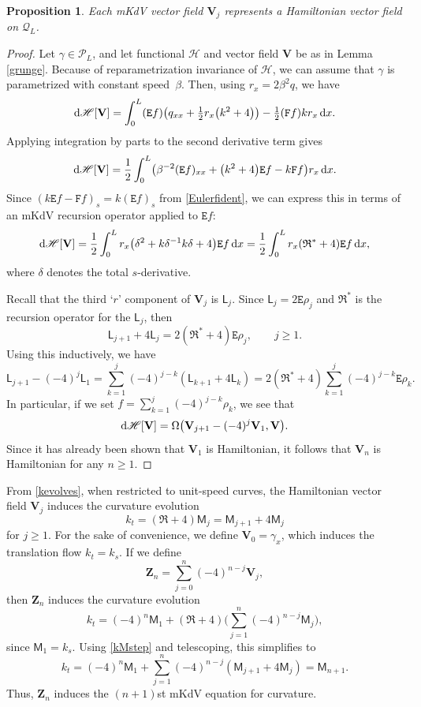 \documentclass[10pt,a4paper]{amsart}
\def\opR{\mathfrak R}
\newcommand\Leg{ {\mathcal P}} %
\newcommand\Legq{\mathcal Q}
\def\Fop{\mathtt F} %
\def\Euler{\mathtt E}
\newcommand\uM{\mathsf M} %
\newcommand\uL{\mathsf L} %
\newcommand\kk{k} %
\newcommand\speed{\beta} %
\def\vecV{\mathbf V}
\newcommand\VV{\mathbf V}
\newcommand\VZ{\mathbf Z}
\newcommand\funH{{\mathscr H}} %
\newcommand{\dx}{\,{\rm d}x}
\def\gam{\gamma} %
\numberwithin{equation}{section}
\newtheorem{Proposition}[Theorem]{Proposition}
 { \theoremstyle{definition}
\newtheorem{Definition}[Theorem]{Definition}
\newtheorem{Note}[Theorem]{Note}
\newtheorem{Example}[Theorem]{Example}
\newtheorem{Remark}[Theorem]{Remark} }
\begin{document}
\begin{Proposition} Each mKdV vector field $\vecV_j$ represents a Hamiltonian vector field on $\Legq_L$.
\end{Proposition}
\begin{proof}
Let $\gam \in \Leg_L$, and let functional $\funH$ and vector field $\VV$ be as in Lemma \ref{grunge}. Because of reparametrization invariance of $\funH$, we can assume that $\gam$ is parametrized with constant speed~$\speed$. Then, using $r_x= 2\speed^2 q$, we have
\[{\rm d}\funH[\VV] = \int_0^L (\Euler f) \bigl( q_{xx} + \tfrac12 r_x \bigl(\kk^2 + 4\bigr)\bigr) - \tfrac12 (\Fop f)k r_x \dx.\]
Applying integration by parts to the second derivative term gives
\[{\rm d}\funH[\VV] =\frac12 \int_0^L \bigl( \beta^{-2} (\Euler f)_{xx} + \bigl(\kk^2+4\bigr) \Euler f - \kk \Fop f\bigr) r_x \dx.\]
Since $(\kk \Euler f -\Fop f)_s = \kk (\Euler f)_s$ from \eqref{Eulerfident}, we can express this in terms of an mKdV recursion operator applied to $\Euler f$:
\[
{\rm d}\funH[\VV] = \frac12 \int_0^L r_x \bigl(\delta^2 + \kk \delta^{-1} \kk \delta + 4\bigr) \Euler f \dx = \frac12 \int_0^L r_x (\opR^* + 4) \Euler f \dx,
\]
where $\delta$ denotes the total $s$-derivative.

Recall that the third `$r$' component of $\VV_j$ is $\uL_j$. Since $\uL_j = 2\Euler \rho_j$ and $\opR^*$ is the recursion operator for the $\uL_j$, then
\[\uL_{j+1} + 4 \uL_j = 2(\opR^* + 4)\Euler \rho_j, \qquad j\ge 1.\]
Using this inductively, we have
\[\uL_{j+1} - (-4)^j \uL_1 = \sum_{k=1}^j (-4)^{j-k} (\uL_{k+1} + 4 \uL_k) = 2 (\opR^* + 4) \sum_{k=1}^j (-4)^{j-k} \Euler \rho_k.\]
In particular, if we set $f = \sum_{k=1}^j (-4)^{j-k}\rho_k$, we see that
\[{\rm d}\funH[\VV] = \Omega\bigl(\vecV_{j+1} -(-4)^j \vecV_1, \VV\bigr).\]
Since it has already been shown that $\vecV_1$ is Hamiltonian, it follows that $\vecV_{n}$ is Hamiltonian for any $n\ge 1$.
\end{proof}

From \eqref{kevolves}, when restricted to unit-speed curves, the Hamiltonian vector field $\vecV_j$ induces the curvature evolution
\begin{equation}\label{kMstep}
\kk_t = (\opR + 4) \uM_j = \uM_{j+1} + 4 \uM_j
\end{equation}
for $j\ge 1$. For the sake of convenience, we define $\vecV_0 = \gam_x$, which induces the translation flow $k_t = k_s$.
If we define
\[
\VZ_n = \sum_{j=0}^n (-4)^{n-j} \vecV_j,
\]
then $\VZ_n$ induces the curvature evolution
\[
\kk_t = (-4)^n \uM_1 + (\opR+4) \Biggl( \sum_{j=1}^n (-4)^{n-j} \uM_j \Biggr),
\]
since $\uM_1 = \kk_s$. Using \eqref{kMstep} and telescoping, this simplifies to
\[\kk_t = (-4)^n \uM_1 +\sum_{j=1}^n (-4)^{n-j} (\uM_{j+1} + 4 \uM_j) = \uM_{n+1}.\]
Thus, $\VZ_n$ induces the $(n+1)$st mKdV equation for curvature.
\end{document}
